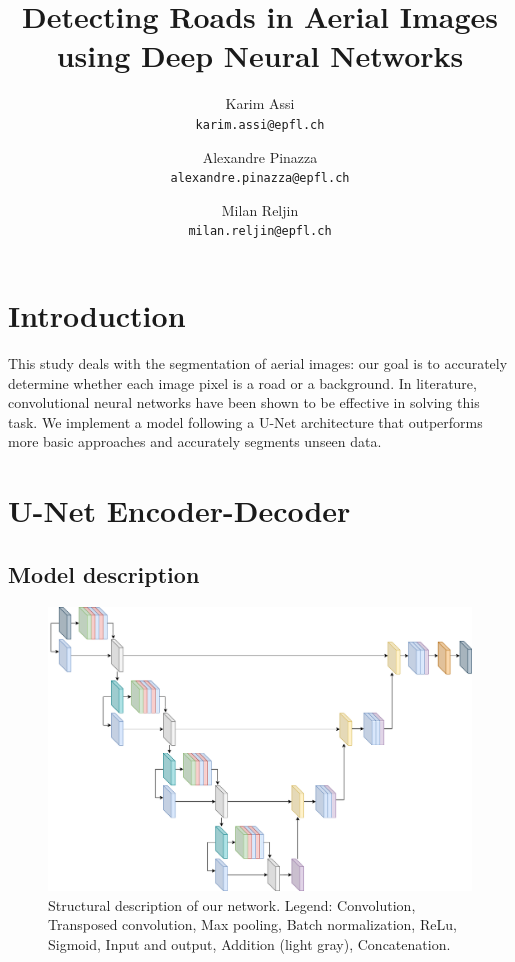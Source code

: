 \documentclass[10pt,conference,compsocconf]{IEEEtran}
\begin{document}
\title{Detecting Roads in Aerial Images using Deep Neural Networks}
\author{
  Karim Assi\\
  \texttt{karim.assi@epfl.ch}
  \and
  Alexandre Pinazza\\
  \texttt{alexandre.pinazza@epfl.ch}
  \and
  Milan Reljin\\
  \texttt{milan.reljin@epfl.ch}
}

\maketitle

    

\section{Introduction}

This study deals with the segmentation of aerial images: our goal is to accurately determine whether each image pixel is a road or a background. In literature, convolutional neural networks have been shown to be effective in solving this task. We implement a model following a U-Net architecture that outperforms more basic approaches and accurately segments unseen data. 

\section{U-Net Encoder-Decoder}

\subsection{Model description}

\begin{figure}
    \centering
    \includegraphics[width = 0.8 \textwidth, height = 0.4 \textwidth]{doc/images/Unet.png}
    \caption{Structural description of our network. Legend: 
    \textcolor{conv}{Convolution},
    \textcolor{convtransp}{Transposed convolution},
    \textcolor{maxpool}{Max pooling},
    \textcolor{batchnorm}{Batch normalization},
    \textcolor{relu}{ReLu}, \textcolor{sigmoid}{Sigmoid},
    \textcolor{io}{Input and output}, \textcolor{add}{Addition} (light gray), \textcolor{concat}{Concatenation}.}
    \label{fig:model_arch}
\end{figure}
\end{document}
